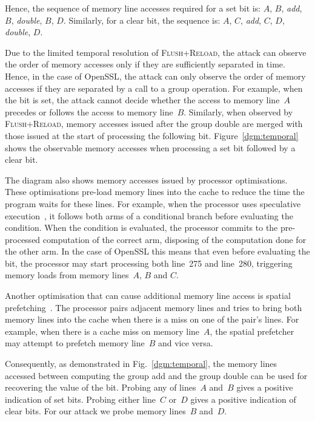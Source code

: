 \documentclass[twocolumn]{article}
\newcommand{\fl}{\textsc{Flu\-sh+\allowbreak Re\-load}\xspace}
\begin{document}
Hence, the sequence of memory line accesses required for a set bit is: $A$, $B$, \textit{add}, $B$, \textit{double}, $B$, $D$.
Similarly, for a clear bit, the sequence is: $A$, $C$, \textit{add}, $C$, $D$, \textit{double}, $D$.

Due to the limited temporal resolution of \fl, the attack can observe the order of memory accesses only
if they are sufficiently separated in time.
Hence, in the case of OpenSSL, the attack can only observe the order of memory accesses if they are separated by a call
to a group operation.
For example, when the bit is set, the attack cannot decide whether the access to memory line~$A$ precedes or follows the access
to memory line~$B$.
Similarly, when observed by \fl, memory accesses issued after the group double are merged with those 
issued at the start of processing the following bit.
Figure~\ref{dgm:temporal} shows the observable memory accesses when processing a set bit followed by
a clear bit.


The diagram also shows memory accesses issued by processor optimisations.
These optimisations pre-load memory lines into the cache to reduce the time the program waits for these lines.
For example, when the processor uses speculative execution~\cite{uht95disjoint}, it follows both arms of a conditional
branch before evaluating the condition.
When the condition is evaluated, the processor commits to the pre-processed computation of the correct arm,
disposing of the computation done for the other arm. 
In the case of OpenSSL this means that even before evaluating the bit, 
the processor may start processing both line~275 and line~280, triggering memory loads from memory lines~$A$, $B$ and $C$.

Another optimisation that can cause additional memory line access is spatial prefetching~\cite{intel12optimization}.
The processor pairs adjacent memory lines and tries to bring both memory lines into the cache
when there is a miss on one of the pair's lines.
For example, when there is a cache miss on memory line~$A$, the spatial prefetcher may attempt to prefetch memory line~$B$
and vice versa.

Consequently, as demonstrated in Fig.~\ref{dgm:temporal}, the memory lines accessed between computing
the group add and the group double can be used for recovering the value of the bit.
Probing any of lines~$A$ and~$B$ gives a positive indication of set bits.  
Probing either line~$C$ or~$D$ gives a positive indication of clear bits.
For our attack we probe memory lines~$B$ and~$D$.
\end{document}
